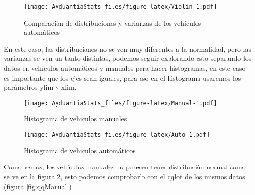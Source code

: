 \documentclass[]{book}
\newenvironment{Shaded}{\begin{snugshade}}{\end{snugshade}}
\newcommand{\KeywordTok}[1]{\textcolor[rgb]{0.13,0.29,0.53}{\textbf{#1}}}
\newcommand{\DataTypeTok}[1]{\textcolor[rgb]{0.13,0.29,0.53}{#1}}
\newcommand{\DecValTok}[1]{\textcolor[rgb]{0.00,0.00,0.81}{#1}}
\newcommand{\OperatorTok}[1]{\textcolor[rgb]{0.81,0.36,0.00}{\textbf{#1}}}
\newcommand{\NormalTok}[1]{#1}
\begin{document}
\begin{figure}
\centering
\texttt{[image: AyduantiaStats\_files/figure-latex/Violin-1.pdf]}
\caption{\label{fig:Violin}Comparación de distribuciones y varianzas de los
vehiculos automáticos}
\end{figure}

En este caso, las distribuciones no se ven muy diferentes a la
normalidad, pero las varianzas se ven un tanto distintas, podemos seguir
explorando esto separando los datos en vehículos automáticos y manuales
para hacer histogramas, en este caso es importante que los ejes sean
iguales, para eso en el histograma usaremos los parámetros ylim y xlim.

\begin{Shaded}
\end{Shaded}

\begin{figure}
\centering
\texttt{[image: AyduantiaStats\_files/figure-latex/Manual-1.pdf]}
\caption{\label{fig:Manual}Histograma de vehiculos manuales}
\end{figure}

\begin{Shaded}
\end{Shaded}

\begin{figure}
\centering
\texttt{[image: AyduantiaStats\_files/figure-latex/Auto-1.pdf]}
\caption{\label{fig:Auto}Histograma de vehiculos automáticos}
\end{figure}

Como vemos, los vehículos manuales no parecen tener distribución normal
como se ve en la figura \ref{fig:Manual}, esto podemos comprobarlo con
el qqlot de los mismos datos (figura \ref{fig:qqManual})
\end{document}
